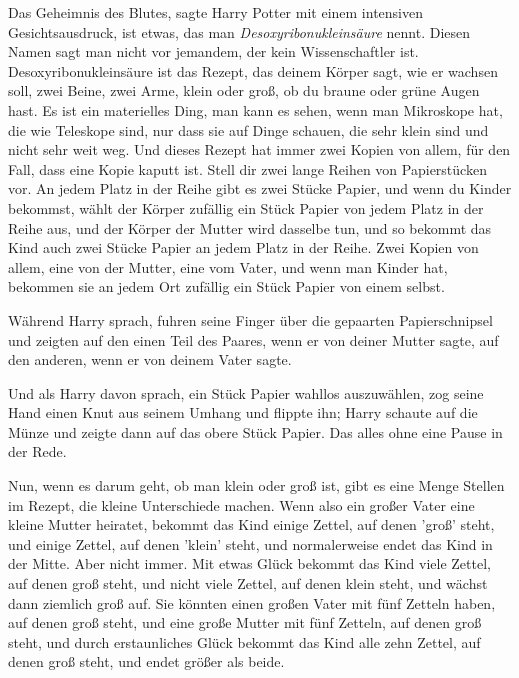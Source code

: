 \glqq Das Geheimnis des Blutes\grqq{}, sagte Harry Potter mit einem intensiven
Gesichtsausdruck, \glqq ist etwas, das man \emph{Desoxyribonukleinsäure} nennt.
Diesen Namen sagt man nicht vor jemandem, der kein Wissenschaftler ist.
Desoxyribonukleinsäure ist das Rezept, das deinem Körper sagt, wie er wachsen
soll, zwei Beine, zwei Arme, klein oder groß, ob du braune oder grüne Augen
hast. Es ist ein materielles Ding, man kann es sehen, wenn man Mikroskope hat,
die wie Teleskope sind, nur dass sie auf Dinge schauen, die sehr klein sind und
nicht sehr weit weg. Und dieses Rezept hat immer zwei Kopien von allem, für den
Fall, dass eine Kopie kaputt ist. Stell dir zwei lange Reihen von Papierstücken
vor. An jedem Platz in der Reihe gibt es zwei Stücke Papier, und wenn du Kinder
bekommst, wählt der Körper zufällig ein Stück Papier von jedem Platz in der
Reihe aus, und der Körper der Mutter wird dasselbe tun, und so bekommt das Kind
auch zwei Stücke Papier an jedem Platz in der Reihe. Zwei Kopien von allem, eine
von der Mutter, eine vom Vater, und wenn man Kinder hat, bekommen sie an jedem
Ort zufällig ein Stück Papier von einem selbst.\grqq{}

Während Harry sprach, fuhren seine Finger über die gepaarten Papierschnipsel und
zeigten auf den einen Teil des Paares, wenn er \glqq von deiner Mutter\grqq{}
sagte, auf den anderen, wenn er \glqq von deinem Vater\grqq{} sagte.

Und als Harry davon sprach, ein Stück Papier wahllos auszuwählen, zog seine Hand
einen Knut aus seinem Umhang und flippte ihn; Harry schaute auf die Münze und
zeigte dann auf das obere Stück Papier. Das alles ohne eine Pause in der Rede.

\glqq Nun, wenn es darum geht, ob man klein oder groß ist, gibt es eine Menge
Stellen im Rezept, die kleine Unterschiede machen. Wenn also ein großer Vater
eine kleine Mutter heiratet, bekommt das Kind einige Zettel, auf denen 'groß'
steht, und einige Zettel, auf denen 'klein' steht, und normalerweise endet das
Kind in der Mitte. Aber nicht immer. Mit etwas Glück bekommt das Kind viele
Zettel, auf denen \glqq groß\grqq{} steht, und nicht viele Zettel, auf denen
\glqq klein\grqq{} steht, und wächst dann ziemlich groß auf. Sie könnten einen
großen Vater mit fünf Zetteln haben, auf denen \glqq groß\grqq{} steht, und eine
große Mutter mit fünf Zetteln, auf denen \glqq groß\grqq{} steht, und durch
erstaunliches Glück bekommt das Kind alle zehn Zettel, auf denen \glqq
groß\grqq{} steht, und endet größer als beide.

